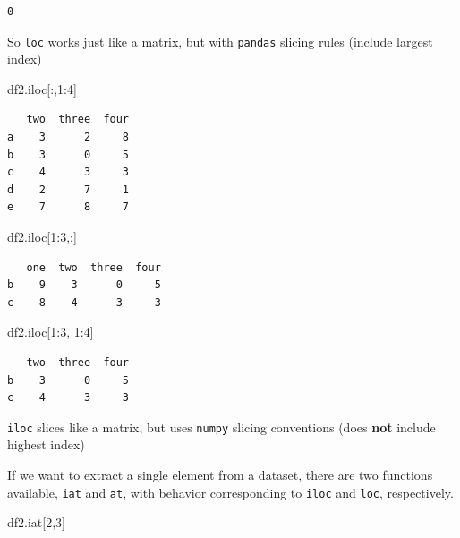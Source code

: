 \documentclass[
  letterpaper,
]{scrbook}
\newenvironment{Shaded}{\begin{snugshade}}{\end{snugshade}}
\newcommand{\DecValTok}[1]{\textcolor[rgb]{0.00,0.00,0.81}{#1}}
\newcommand{\NormalTok}[1]{#1}
\begin{document}
\begin{verbatim}
0
\end{verbatim}

So \texttt{loc} works just like a matrix, but with \texttt{pandas} slicing rules (include largest index)

\begin{Shaded}
\begin{Highlighting}[]
\NormalTok{df2.iloc[:,}\DecValTok{1}\NormalTok{:}\DecValTok{4}\NormalTok{]}
\end{Highlighting}
\end{Shaded}

\begin{verbatim}
   two  three  four
a    3      2     8
b    3      0     5
c    4      3     3
d    2      7     1
e    7      8     7
\end{verbatim}

\begin{Shaded}
\begin{Highlighting}[]
\NormalTok{df2.iloc[}\DecValTok{1}\NormalTok{:}\DecValTok{3}\NormalTok{,:]}
\end{Highlighting}
\end{Shaded}

\begin{verbatim}
   one  two  three  four
b    9    3      0     5
c    8    4      3     3
\end{verbatim}

\begin{Shaded}
\begin{Highlighting}[]
\NormalTok{df2.iloc[}\DecValTok{1}\NormalTok{:}\DecValTok{3}\NormalTok{, }\DecValTok{1}\NormalTok{:}\DecValTok{4}\NormalTok{]}
\end{Highlighting}
\end{Shaded}

\begin{verbatim}
   two  three  four
b    3      0     5
c    4      3     3
\end{verbatim}

\texttt{iloc} slices like a matrix, but uses \texttt{numpy} slicing conventions (does \textbf{not} include highest index)

If we want to extract a single element from a dataset, there are two functions available, \texttt{iat} and \texttt{at}, with behavior corresponding to \texttt{iloc} and \texttt{loc}, respectively.

\begin{Shaded}
\begin{Highlighting}[]
\NormalTok{df2.iat[}\DecValTok{2}\NormalTok{,}\DecValTok{3}\NormalTok{]}
\end{Highlighting}
\end{Shaded}
\end{document}
